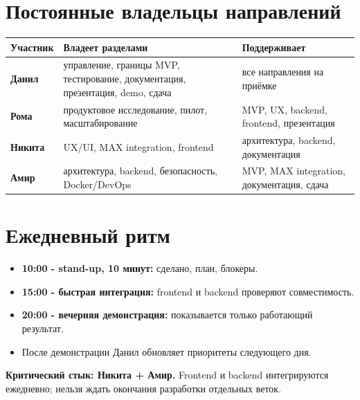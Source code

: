 \documentclass[11pt,a4paper]{article}
\begin{document}
\section{Постоянные владельцы направлений}
\begin{tabularx}{\textwidth}{>{\bfseries}p{25mm}X X}\toprule
Участник & Владеет разделами & Поддерживает\\\midrule
Данил & управление, границы MVP, тестирование, документация, презентация, demo, сдача & все направления на приёмке\\
Рома & продуктовое исследование, пилот, масштабирование & MVP, UX, backend, frontend, презентация\\
Никита & UX/UI, MAX integration, frontend & архитектура, backend, документация\\
Амир & архитектура, backend, безопасность, Docker/DevOps & MVP, MAX integration, документация, сдача\\\bottomrule
\end{tabularx}

\section{Ежедневный ритм}
\begin{itemize}
  \item \textbf{10:00 - stand-up, 10 минут:} сделано, план, блокеры.
  \item \textbf{15:00 - быстрая интеграция:} frontend и backend проверяют совместимость.
  \item \textbf{20:00 - вечерняя демонстрация:} показывается только работающий результат.
  \item После демонстрации Данил обновляет приоритеты следующего дня.
\end{itemize}
\begin{alertbox}\textbf{Критический стык: Никита + Амир.} Frontend и backend интегрируются ежедневно; нельзя ждать окончания разработки отдельных веток.\end{alertbox}
\end{document}
